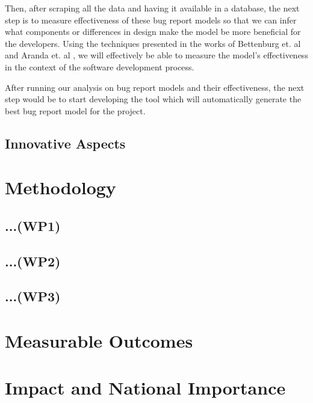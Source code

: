 \documentclass[11pt,english,twocolumn]{article}
\begin{document}
Then, after scraping all the data and having it available in a database, the next step is
to measure effectiveness of these bug report models so that we can infer what components
or differences in design make the model be more beneficial for the developers. Using the
techniques presented in the works of Bettenburg et. al \cite{bettenburg2008makes} and 
Aranda et. al \cite{aranda2009secret}, we will effectively be able to measure the model's 
effectiveness in the context of the software development process.

After running our analysis on bug report models and their effectiveness, the next step
would be to start developing the tool which will automatically generate the best bug
report model for the project.


\subsection*{Innovative Aspects}

\section{Methodology}

\subsection*{...(WP1)}

\subsection*{...(WP2)}

\subsection*{...(WP3)}

\section{Measurable Outcomes}

\section{Impact and National Importance}

\let\oldbibliography\thebibliography
\renewcommand{\thebibliography}[1]{\oldbibliography{#1}
\setlength{\itemsep}{-3pt}}


{
\scriptsize

}
\end{document}
